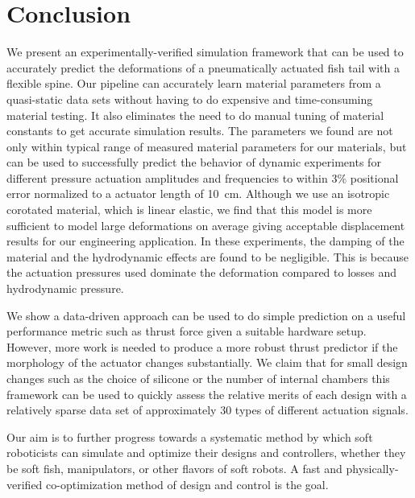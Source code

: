 \section{Conclusion}
\label{conclusion}
We present an experimentally-verified simulation framework that can be used to accurately predict the deformations of a pneumatically actuated fish tail with a flexible spine.
Our pipeline can accurately learn material parameters from a quasi-static data sets without having to do expensive and time-consuming material testing. It also eliminates the need to do manual tuning of material constants to get accurate simulation results. The parameters we found are not only within typical range of measured material parameters for our materials, but can be used to successfully predict the behavior of dynamic experiments for different pressure actuation amplitudes and frequencies to within $3\%$ positional error normalized to a actuator length of \SI{10}{cm}. Although we use an isotropic corotated material, which is linear elastic, we find that this model is more sufficient to model large deformations on average giving acceptable displacement results for our engineering application. In these experiments, the damping of the material and the hydrodynamic effects are found to be negligible. This is because the actuation pressures used dominate the deformation compared to losses and hydrodynamic pressure. 

We show a data-driven approach can be used to do simple prediction on a useful performance metric such as thrust force given a suitable hardware setup. However, more work is needed to produce a more robust thrust predictor if the morphology of the actuator changes substantially. We claim that for small design changes such as the choice of silicone or the number of internal chambers this framework can be used to quickly assess the relative merits of each design with a relatively sparse data set of approximately 30 types of different actuation signals.

Our aim is to further progress towards a systematic method by which soft roboticists can simulate and optimize their designs and controllers, whether they be soft fish, manipulators, or other flavors of soft robots. A fast and physically-verified co-optimization method of design and control is the goal.